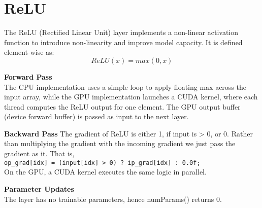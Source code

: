 \section{ReLU}

The ReLU (Rectified Linear Unit) layer implements a non-linear activation function to introduce non-linearity and improve model capacity. It is defined element-wise as:
$$ReLU(x) = max(0,x)$$

\textbf{Forward Pass}\\
The CPU implementation uses a simple loop to apply floating max across the input array, while the GPU implementation launches a CUDA kernel, where each thread computes the ReLU output for one element. The GPU output buffer (device forward buffer) is passed as input to the next layer.

\textbf{Backward Pass}
The gradient of ReLU is either 1, if input is > 0, or 0. Rather than multiplying the gradient with the incoming gradient we just pass the gradient as it. That is,\\ \verb|op_grad[idx] = (input[idx] > 0) ? ip_grad[idx] : 0.0f;|\\ On the GPU, a CUDA kernel executes the same logic in parallel.

\textbf{Parameter Updates}\\
The layer has no trainable parameters, hence numParams() returns 0.
